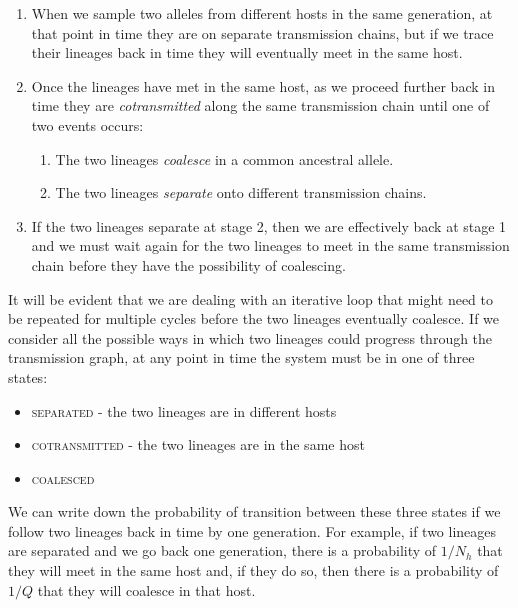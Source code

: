 \documentclass[_main.tex]{subfiles}
\begin{document}
\begin{enumerate}

\item When we sample two alleles from different hosts in the same generation, at that point in time they are on separate transmission chains, but if we trace their lineages back in time they will eventually meet in the same host. 

\item Once the lineages have met in the same host, as we proceed further back in time they are \textit{cotransmitted} along the same transmission chain until one of two events occurs:

\begin{enumerate}

\item The two lineages \textit{coalesce} in a common ancestral allele.

\item The two lineages \textit{separate} onto different transmission chains.

\end{enumerate}

\item If the two lineages separate at stage 2, then we are effectively back at stage 1 and we must wait again for the two lineages to meet in the same transmission chain before they have the possibility of coalescing.

\end{enumerate}

It will be evident that we are dealing with an iterative loop that might need to be repeated for multiple cycles before the two lineages eventually coalesce.  If we consider all the possible ways in which two lineages could progress through the transmission graph, at any point in time the system must be in one of three states:

\begin{itemize} [noitemsep]

\item \textsc{separated} - the two lineages are in different hosts

\item \textsc{cotransmitted} - the two lineages are in the same host

\item \textsc{coalesced}

\end{itemize}

We can write down the probability of transition between these three states if we follow two lineages back in time by one generation.  For example, if two lineages are separated and we go back one generation, there is a probability of $1/N_h$ that they will meet in the same host and, if they do so, then there is a probability of $1/Q$ that they will coalesce in that host.
\end{document}

